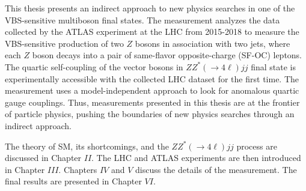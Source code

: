 This thesis presents an indirect approach to new physics searches in one of the VBS-sensitive multiboson final states. The measurement analyzes the data collected by the ATLAS experiment at the LHC from 2015-2018 to measure the VBS-sensitive production of two $Z$ bosons in association with two jets, where each $Z$ boson decays into a pair of same-flavor opposite-charge (SF-OC) leptons. The quartic self-coupling of the vector bosons in $ZZ^*(\rightarrow 4\ell)jj$ final state is experimentally accessible with the collected LHC dataset for the first time. The measurement uses a model-independent approach to look for anomalous quartic gauge couplings. Thus, measurements presented in this thesis are at the frontier of particle physics, pushing the boundaries of new physics searches through an indirect approach. 

The theory of SM, its shortcomings, and the $ZZ^*(\rightarrow 4\ell)jj$ process are discussed in Chapter $II$. The LHC and ATLAS experiments are then introduced in Chapter $III$. Chapters $IV$ and $V$ discuss the details of the measurement. The final results are presented in Chapter $VI$. 
